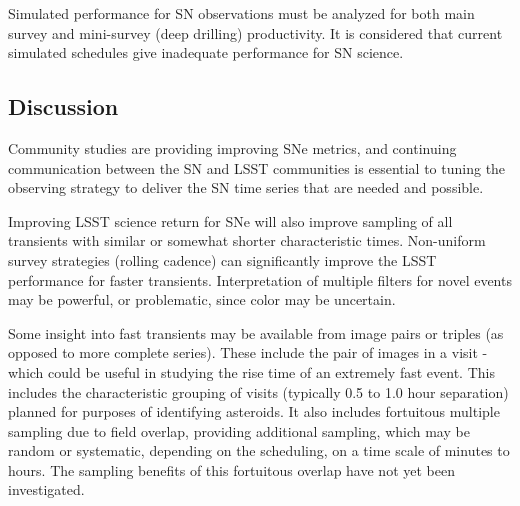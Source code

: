 Simulated performance for SN observations must be analyzed for both main survey and mini-survey (deep drilling) productivity.  It is considered that current simulated schedules give inadequate performance for SN science.




\subsection{Discussion}
\label{sec:\secname:discussion}

Community studies are providing improving SNe metrics, and continuing communication between the SN and LSST communities is essential to tuning the observing strategy to deliver the SN time series that are needed and possible.

Improving LSST science return for SNe will also improve sampling of all transients with similar or somewhat shorter characteristic times.  Non-uniform survey strategies (rolling cadence) can significantly improve the LSST performance for faster transients.  Interpretation of multiple filters for novel events may be powerful, or problematic, since color may be uncertain.

Some insight into fast transients may be available from image pairs  or triples (as opposed to more complete series).  These include the pair of images in a visit - which could be useful in studying the rise time of an extremely fast event.  This includes the characteristic grouping of visits (typically 0.5 to 1.0 hour separation) planned for purposes of identifying asteroids.  It also includes fortuitous multiple sampling due to field overlap, providing additional sampling, which may be random or systematic, depending on the scheduling, on a time scale of minutes to hours.  The sampling benefits of this fortuitous overlap have not yet been investigated.





\navigationbar
